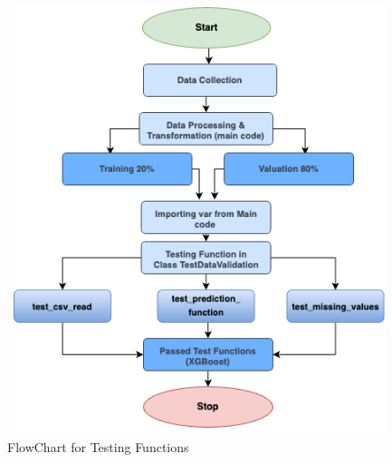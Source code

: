 	\begin{center}
		\begin{figure}[h!]
			\begin{center}
				\includegraphics[height=125mm, width=130mm]{Images/TestFunFlowChart}
			\end{center}
			\caption{ FlowChart for Testing Functions }
		\end{figure}
	\end{center}